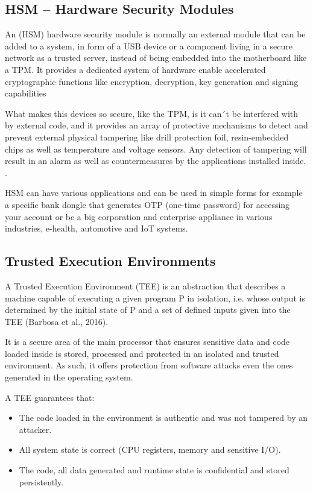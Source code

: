 \subsection{HSM – Hardware Security Modules} %
\label{ssec:hardware_security_modules}

An (\gls{HSM}) hardware security module is normally an external module that can be added to a system, in form of a \gls{USB} device or a component living in a secure network as a trusted server, instead of being embedded into the motherboard like a \gls{TPM}. It provides a dedicated system of hardware enable accelerated cryptographic functions like encryption, decryption, key generation and signing capabilities \cite{hsm:1}

What makes this devices so secure, like the \gls{TPM}, is it can´t be interfered with by external code, and it provides an array of protective mechanisms to detect and prevent external physical tampering like drill protection foil, resin-embedded chips as well as temperature and voltage sensors. Any detection of tampering will result in an alarm as well as countermeasures by the applications installed inside. \cite{hsm:2}.

\gls{HSM} can have various applications and can be used in simple forms for example a specific bank dongle that generates \gls{OTP} (one-time password) for accessing your account or be a big corporation and enterprise appliance in various industries, e-health, automotive and \gls{IoT} systems.

\subsection{Trusted Execution Environments} %
\label{ssec:trusted_execution_environments}

A Trusted Execution Environment (\gls{TEE}) is an abstraction that describes a machine
capable of executing a given program P in isolation, i.e. whose output is determined by
the initial state of P and a set of defined inputs given into the \gls{TEE} (Barbosa et al., 2016).

It is a secure area of the main processor that ensures sensitive data and code loaded inside is stored, processed and protected in an isolated and trusted environment. As such, it offers protection from software attacks even the ones generated in the operating system.

A \gls{TEE} guarantees that: 
\begin{itemize}
	\item The code loaded in the environment is authentic and was not tampered by an attacker.
	\item All system state is correct (CPU registers, memory and sensitive I/O).
	\item The code, all data generated and runtime state is confidential and stored persistently.
\end{itemize}

